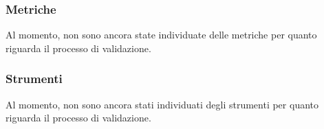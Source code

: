 \subsubsection{Metriche}
Al momento, non sono ancora state individuate delle metriche per quanto riguarda il processo di validazione.
\subsubsection{Strumenti}
Al momento, non sono ancora stati individuati degli strumenti per quanto riguarda il processo di validazione.
